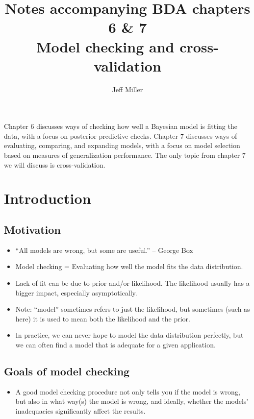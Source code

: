 \documentclass[12pt]{article}
\title{Notes accompanying BDA chapters 6 \& 7\\
\large Model checking and cross-validation
}
\author{Jeff Miller}
\begin{document}
\maketitle

\tableofcontents


\newpage

\vspace{2em}

Chapter 6 discusses ways of checking how well a Bayesian model is fitting the data, with a focus on posterior predictive checks. Chapter 7 discusses ways of evaluating, comparing, and expanding models, with a focus on model selection based on measures of generalization performance. The only topic from chapter 7 we will discuss is cross-validation.

\section{Introduction}

\subsection*{Motivation}
\begin{itemize}
\item ``All models are wrong, but some are useful.'' -- George Box
\item Model checking = Evaluating how well the model fits the data distribution.
\item Lack of fit can be due to prior and/or likelihood. The likelihood usually has a bigger impact, especially asymptotically.
\item Note: ``model'' sometimes refers to just the likelihood, but sometimes (such as here) it is used to mean both the likelihood and the prior.
\item In practice, we can never hope to model the data distribution perfectly, but we can often find a model that is adequate for a given application.
\end{itemize}

\subsection*{Goals of model checking}
\begin{itemize}
\item A good model checking procedure not only tells you if the model is wrong, but also in what way(s) the model is wrong, and ideally, whether the models' inadequacies significantly affect the results.
\end{itemize}
\end{document}
